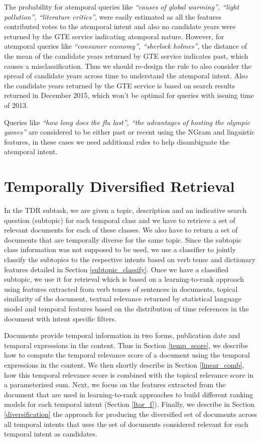 \documentclass{sig-alternate}
\begin{document}
The probability for atemporal queries like \textit{``causes of global warming'', ``light pollution'', ``literature critics''}, were easily estimated as all the features contributed votes to the atemporal intent and also no candidate years were returned by the \textsf{GTE service} indicating atemporal nature. However, for atemporal queries like \textit{``consumer economy'', ``sherlock holmes''}, the distance of the mean of the candidate years returned by \textsf{GTE service} indicates past, which causes a misclassification. Thus we should re-design the rule to also consider the spread of candidate years across time to understand the atemporal intent. Also the candidate years returned by the \textsf{GTE service} is based on search results returned in December 2015, which won't be optimal for queries with issuing time of 2013.

Queries like \textit{``how long does the flu last'', ``the advantages of hosting the olympic games''} are considered to be either past or recent using the \textsf{NGram} and \textsf{linguistic} features, in these cases we need additional rules to help disambiguate the atemporal intent. 

\section{Temporally Diversified Retrieval}\label{TDR}
In the TDR subtask, we are given a topic, description and an indicative search question (subtopic) for each temporal class and we have to retrieve a set of relevant documents for each of these classes. We also have to return a set of documents that are temporally diverse for the same topic. Since the subtopic class information was not supposed to be used, we use a classifier to jointly classify the subtopics to the respective intents based on verb tense and dictionary features detailed in Section \ref{subtopic_classify}. Once we have a classified subtopic, we use it for retrieval which is based on a \textsf{learning-to-rank} approach using features extracted from verb tenses of sentences in documents, topical similarity of the document, textual relevance returned by statistical language model and temporal features based on the distribution of time references in the document with intent specific filters.

Documents provide temporal information in two forms, publication date and temporal expressions in the content. Thus in Section \ref{temp_score}, we describe how to compute the temporal relevance score of a document using the temporal expressions in the content. We then shortly describe in Section \ref{linear_comb}, how this temporal relevance score is combined with the topical relevance score in a parameterized sum. Next, we focus on the features extracted from the document that are used in learning-to-rank approaches to build different ranking models for each temporal intent (Section \ref{ltor_f}). Finally, we describe in Section \ref{diversification} the approach for producing the diversified set of documents across all temporal intents that uses the set of documents considered relevant for each temporal intent as candidates. 
\end{document}
